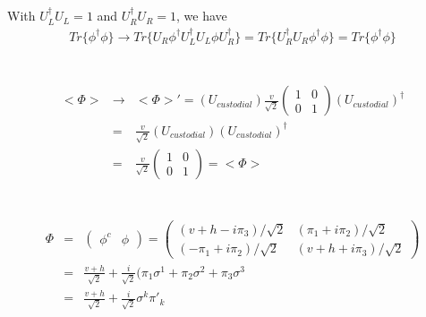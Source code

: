 \documentclass[11pt]{article}
\begin{document}
\section{ }
With $U_L^\dagger U_L=1$ and $U_R^\dagger U_R=1$, we have
\begin{eqnarray}
    Tr\{\phi^\dagger \phi \} \to     Tr\{U_R \phi^\dagger U_L^\dagger U_L \phi U_R^\dagger \}=  Tr\{ U_R^\dagger U_R \phi^\dagger \phi  \}=Tr\{ \phi^\dagger \phi  \}
\end{eqnarray}

\section{ }
\begin{eqnarray}
    <\Phi> &\to& <\Phi>'
               = (U_{custodial})
               \frac{v}{\sqrt 2}
                \begin{pmatrix}
                    1&0 \\0 &1
                \end{pmatrix}
    (U_{custodial})^\dagger \\
               &=&\frac{v}{\sqrt 2}
               (U_{custodial})(U_{custodial})^\dagger \\
               &=& \frac{v}{\sqrt 2}
               \begin{pmatrix}
                   1&0 \\0 &1
               \end{pmatrix}=<\Phi>
  \end{eqnarray}

\section{ }
\begin{eqnarray}
    \Phi &=&
    \begin{pmatrix}
      \phi^c & \phi
    \end{pmatrix}
    =
    \begin{pmatrix}
      ( v + h -i\pi_3)/\sqrt{2} & (\pi_1 + i\pi_2)/\sqrt{2} \\
      (-\pi_1 +i\pi_2)/\sqrt{2} & ( v + h +i\pi_3)/\sqrt{2}
    \end{pmatrix}\\
    &=&\frac{v+h}{\sqrt{2}} +\frac{i}{\sqrt 2}(\pi_1 \sigma^1+\pi_2\sigma^2+\pi_3\sigma^3 \\
    &=& \frac{v+h}{\sqrt{2}} + \frac{i}{\sqrt 2} \sigma^k \pi'_k
  \end{eqnarray}
\end{document}
